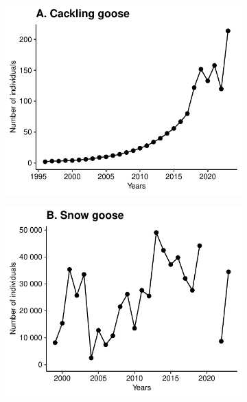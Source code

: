 \documentclass[a4paper,twoside,12pt]{article}
\begin{document}
\begin{landscape}

\end{landscape}
\restoregeometry
\newpage
\begin{figure}[h]
\caption{Time series of the estimated annual adult abundance of vertebrate species on the southern plain of Bylot Island (389 km\textsuperscript{2}). Estimated abundance represents adult individuals, with the exception of lemmings, for which juveniles were also included in the estimate. Time series shorter than 5 years are not presented.}
  \centering
  \begin{subfigure}{0.45\textwidth}
    \includegraphics[width=\linewidth]{figures/species_temporal_series/Cackling_goose.pdf}
  \end{subfigure}
  \begin{subfigure}{0.45\textwidth}
    \includegraphics[width=\linewidth]{figures/species_temporal_series/Snow_goose.pdf}

\end{subfigure}
\end{figure}
\end{document}

